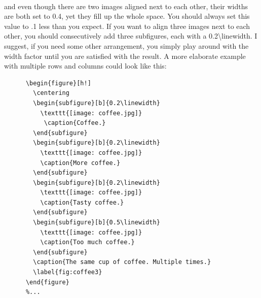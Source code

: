     \paragraph{ }
      and even though there are two images aligned 
      next to each other, their widths are both set
      to 0.4, yet they fill up the whole space. 
      You should always set this value to .1 less
      than you expect. If you want to align three 
      images next to each other, you should 
      consecutively add three subfigures, each
      with a 0.2\textbackslash linewidth. I suggest, if you 
      need some other arrangement, you simply play
      around with the width factor until you 
      are satisfied with the result. A more 
      elaborate example with multiple rows 
      and columns could look like this:
    \begin{lstlisting}[language={[LaTeX]TeX}, breaklines=true,frame=single]
      %...
      \begin{figure}[h!]
        \centering
        \begin{subfigure}[b]{0.2\linewidth}
          \texttt{[image: coffee.jpg]}
           \caption{Coffee.}
        \end{subfigure}
        \begin{subfigure}[b]{0.2\linewidth}
          \texttt{[image: coffee.jpg]}
          \caption{More coffee.}
        \end{subfigure}
        \begin{subfigure}[b]{0.2\linewidth}
          \texttt{[image: coffee.jpg]}
          \caption{Tasty coffee.}
        \end{subfigure}
        \begin{subfigure}[b]{0.5\linewidth}
          \texttt{[image: coffee.jpg]}
          \caption{Too much coffee.}
        \end{subfigure}
        \caption{The same cup of coffee. Multiple times.}
        \label{fig:coffee3}
      \end{figure}
      %...
    \end{lstlisting}


